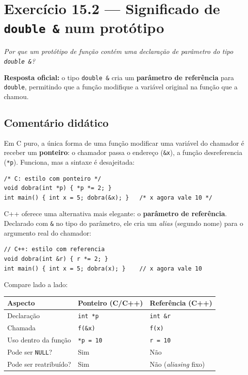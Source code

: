 \documentclass[11pt,a4paper]{article}
\begin{document}
\section{Exerc\'icio 15.2 --- Significado de \texttt{double \&} num prot\'otipo}

\textit{Por que um prot\'otipo de fun\c{c}\~ao cont\'em uma declara\c{c}\~ao de par\^ametro do tipo \texttt{double \&}?}

\begin{resposta}\textbf{Resposta oficial:} o tipo \texttt{double \&} cria um \textbf{par\^ametro de refer\^encia} para \texttt{double}, permitindo que a fun\c{c}\~ao modifique a vari\'avel original na fun\c{c}\~ao que a chamou.\end{resposta}

\subsection*{Coment\'ario did\'atico}

Em C puro, a \'unica forma de uma fun\c{c}\~ao modificar uma vari\'avel do chamador \'e receber um \textbf{ponteiro}: o chamador passa o endere\c{c}o (\texttt{\&x}), a fun\c{c}\~ao desreferencia (\texttt{*p}). Funciona, mas a sintaxe \'e desajeitada:

\begin{lstlisting}[style=cppcode,numbers=none]
/* C: estilo com ponteiro */
void dobra(int *p) { *p *= 2; }
int main() { int x = 5; dobra(&x); }   /* x agora vale 10 */
\end{lstlisting}

C++ oferece uma alternativa mais elegante: o \textbf{par\^ametro de refer\^encia}. Declarado com \texttt{\&} no tipo do par\^ametro, ele cria um \emph{alias} (segundo nome) para o argumento real do chamador:

\begin{lstlisting}[style=cppcode,numbers=none]
// C++: estilo com referencia
void dobra(int &r) { r *= 2; }
int main() { int x = 5; dobra(x); }    // x agora vale 10
\end{lstlisting}

Compare lado a lado:

\begin{center}
\renewcommand{\arraystretch}{1.3}
\begin{tabular}{|l|l|l|}
\hline
\textbf{Aspecto} & \textbf{Ponteiro (C/C++)} & \textbf{Refer\^encia (C++)} \\
\hline
Declara\c{c}\~ao        & \texttt{int *p}      & \texttt{int \&r} \\
Chamada                 & \texttt{f(\&x)}      & \texttt{f(x)} \\
Uso dentro da fun\c{c}\~ao & \texttt{*p = 10}  & \texttt{r = 10} \\
Pode ser \texttt{NULL}? & Sim                  & N\~ao \\
Pode ser reatribu\'ido? & Sim                  & N\~ao (\emph{aliasing} fixo) \\
\hline
\end{tabular}
\end{center}
\end{document}
